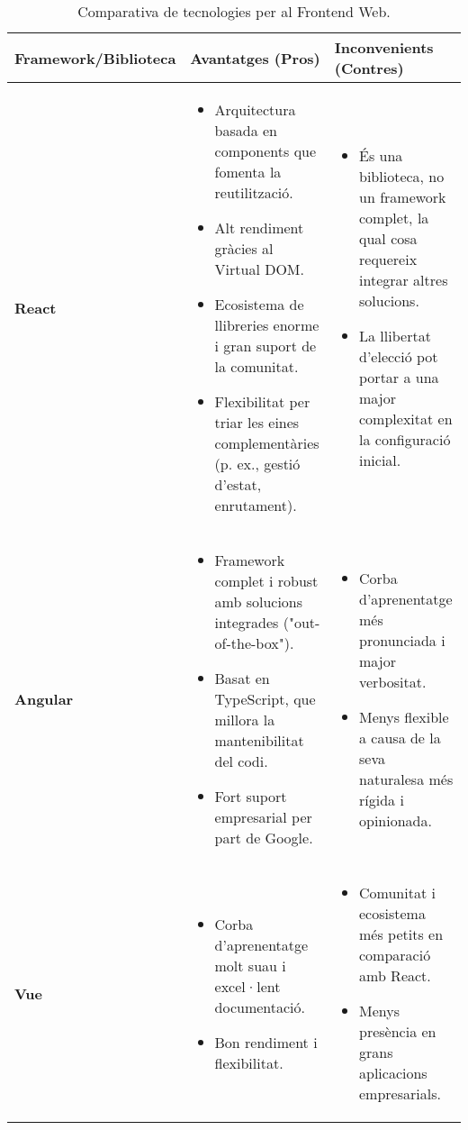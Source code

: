 \begin{table}[h]
\centering
\begin{tabular}{|l|p{4.5cm}|p{4.5cm}|}
\hline
\textbf{Framework/Biblioteca} & \textbf{Avantatges (Pros)} & \textbf{Inconvenients (Contres)} \\
\hline
\textbf{React} &
\begin{itemize}
    \item Arquitectura basada en components que fomenta la reutilització.
    \item Alt rendiment gràcies al Virtual DOM.
    \item Ecosistema de llibreries enorme i gran suport de la comunitat.
    \item Flexibilitat per triar les eines complementàries (p. ex., gestió d'estat, enrutament).
\end{itemize} &
\begin{itemize}
    \item És una biblioteca, no un framework complet, la qual cosa requereix integrar altres solucions.
    \item La llibertat d'elecció pot portar a una major complexitat en la configuració inicial.
\end{itemize} \\
\hline
\textbf{Angular} &
\begin{itemize}
    \item Framework complet i robust amb solucions integrades ("out-of-the-box").
    \item Basat en TypeScript, que millora la mantenibilitat del codi.
    \item Fort suport empresarial per part de Google.
\end{itemize} &
\begin{itemize}
    \item Corba d'aprenentatge més pronunciada i major verbositat.
    \item Menys flexible a causa de la seva naturalesa més rígida i opinionada.
\end{itemize} \\
\hline
\textbf{Vue} &
\begin{itemize}
    \item Corba d'aprenentatge molt suau i excel·lent documentació.
    \item Bon rendiment i flexibilitat.
\end{itemize} &
\begin{itemize}
    \item Comunitat i ecosistema més petits en comparació amb React.
    \item Menys presència en grans aplicacions empresarials.
\end{itemize} \\
\hline
\end{tabular}
\caption{Comparativa de tecnologies per al Frontend Web.}
\label{tab:frontend_frameworks_comparison}
\end{table}

